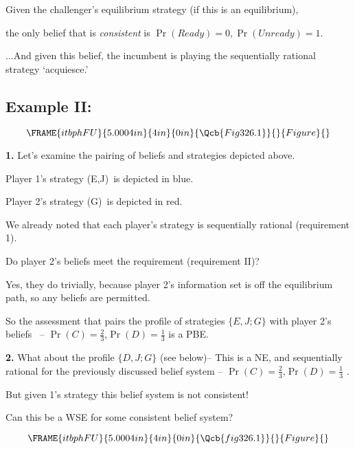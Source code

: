 \documentclass{article}
\begin{document}
Given the challenger's equilibrium strategy (if this is an equilibrium),

the only belief that is \textit{consistent} is $\Pr (Ready)=0,\Pr
(Unready)=1.$

\bigskip

...And given this belief, the incumbent is playing the sequentially rational
strategy `acquiesce.'

\bigskip

\bigskip

\subsection{Example II:\ }

\[
\FRAME{itbphFU}{5.0004in}{4in}{0in}{\Qcb{Fig 326.1}}{}{Figure}{\special%
{language "Scientific Word";type "GRAPHIC";maintain-aspect-ratio
TRUE;display "USEDEF";valid_file "T";width 5.0004in;height 4in;depth
0in;original-width 5.1515in;original-height 4.8161in;cropleft "0";croptop
"1";cropright "1";cropbottom "0";tempfilename
'JSHANV33.wmf';tempfile-properties "XPR";}}
\]

\textbf{1. }Let's examine the pairing of beliefs and strategies depicted
above. \

Player 1's strategy (E,J)\ is depicted in blue.

Player 2's strategy (G)\ is depicted in red. \

We already noted that each player's strategy is sequentially rational
(requirement 1).

Do player 2's beliefs meet the  requirement (requirement II)?

Yes, they do trivially, because player 2's information set is off the
equilibrium path, so any beliefs are permitted.

So the assessment that pairs the profile of strategies $\{E,J;G\}$ with
player 2's beliefs \ -- $\Pr (C)=\frac{2}{3}$,$\Pr (D)=\frac{1}{3}$ is a PBE.

\bigskip

\bigskip

\textbf{2. }What about the profile $\{D,J;G\}$ (see below)-- This is a NE,
and sequentially rational for the previously discussed belief system -- $\Pr
(C)=\frac{2}{3}$,$\Pr (D)=\frac{1}{3}$ .

But given 1's strategy this belief system is not consistent! \

Can this be a WSE for some consistent belief system?

\[
\FRAME{itbphFU}{5.0004in}{4in}{0in}{\Qcb{fig 326.1}}{}{Figure}{\special%
{language "Scientific Word";type "GRAPHIC";maintain-aspect-ratio
TRUE;display "USEDEF";valid_file "T";width 5.0004in;height 4in;depth
0in;original-width 5.3358in;original-height 4.6484in;cropleft "0";croptop
"1";cropright "1";cropbottom "0";tempfilename
'JSHANV34.wmf';tempfile-properties "XPR";}}
\]
\end{document}
